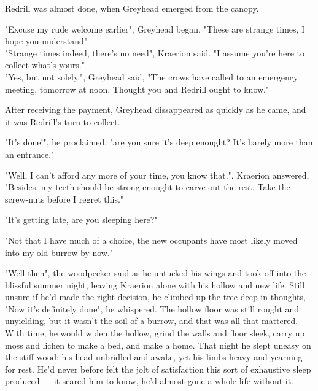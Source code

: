 Redrill was almost done, when Greyhead emerged from the canopy. 

"Excuse my rude welcome earlier", Greyhead began, "These are strange times, I hope you understand"\\

"Strange times indeed, there's no need", Kraerion said. "I assume you're here to collect what's yours."\\

"Yes, but not solely.", Greyhead said, "The crows have called to an emergency meeting, tomorrow at noon. Thought you and Redrill ought to know."

After receiving the payment, Greyhead dissappeared as quickly as he came, and it was Redrill's turn to collect.

"It's done!", he proclaimed, "are you sure it's deep enought? It's barely more than an entrance."

"Well, I can't afford any more of your time, you know that.", Kraerion answered, "Besides, my teeth should be strong enought to carve out the rest. Take the screw-nuts before I regret this."

"It's getting late, are you sleeping here?"

"Not that I have much of a choice, the new occupants have most likely moved into my old burrow by now."


"Well then", the woodpecker said as he untucked his wings and took off into the blissful summer night, leaving Kraerion alone with his hollow and new life. Still unsure if he'd made the right decision, he climbed up the tree deep in thoughts, "Now it's definitely done", he whispered. The hollow floor was still rought and unyielding, but it wasn't the soil of a burrow, and that was all that mattered. With time, he would widen the hollow, grind the walls and floor sleek, carry up moss and lichen to make a bed, and make a home. That night he slept uneasy on the stiff wood; his head unbridled and awake, yet his limbs heavy and yearning for rest. He'd never before felt the jolt of satisfaction this sort of exhaustive sleep produced — it scared him to know, he'd almost gone a whole life without it.



